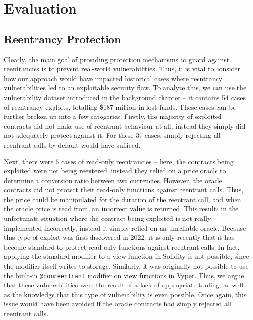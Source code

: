 \chapter{Evaluation}\label{ch:evaluation}

\section{Reentrancy Protection}

Clearly, the main goal of providing protection mechanisms to guard against reentrancies is to prevent real-world vulnerabilities. Thus, it is vital to consider how our approach would have impacted historical cases where reentrancy vulnerabilities led to an exploitable security flaw. To analyze this, we can use the vulnerability dataset introduced in the background chapter -- it contains 54 cases of reentrancy exploits, totalling \$187 million in lost funds. These cases can be further broken up into a few categories. Firstly, the majority of exploited contracts did not make use of reentrant behaviour at all, instead they simply did not adequately protect against it. For these 37 cases, simply rejecting all reentrant calls by default would have sufficed.
\par
Next, there were 6 cases of read-only reentrancies -- here, the contracts being exploited were not being reentered, instead they relied on a price oracle to determine a conversion ratio between two currencies. However, the oracle contracts did not protect their read-only functions against reentrant calls. Thus, the price could be manipulated for the duration of the reentrant call, and when the oracle price is read from, an incorrect value is returned. This results in the unfortunate situation where the contract being exploited is not really implemented incorrectly, instead it simply relied on an unreliable oracle. Because this type of exploit was first discovered in 2022, it is only recently that it has become standard to protect read-only functions against reentrant calls. In fact, applying the standard  modifier to a view function in Solidity is not possible, since the modifier itself writes to storage. Similarly, it was originally not possible to use the built-in \lstinline{@nonreentrant} modifier on view functions in Vyper. Thus, we argue that these vulnerabilities were the result of a lack of appropriate tooling, as well as the knowledge that this type of vulnerability is even possible. Once again, this issue would have been avoided if the oracle contracts had simply rejected all reentrant calls.
